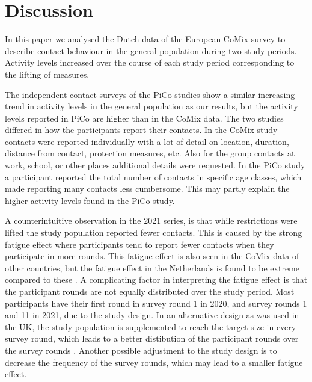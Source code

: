 \documentclass[fleqn,10pt]{wlscirep}
\begin{document}
\section*{Discussion}

In this paper we analysed the Dutch data of the European CoMix survey to describe contact behaviour in the general population during two study periods. Activity levels increased over the course of each study period corresponding to the lifting of measures. %

The independent contact surveys of the PiCo studies show a similar increasing trend in activity levels in the general population as our results, but the activity levels reported in PiCo are higher than in the CoMix data. The two studies differed in how the participants report their contacts. In the CoMix study contacts were reported individually with a lot of detail on location, duration, distance from contact, protection measures, etc. Also for the group contacts at work, school, or other places additional details were requested. In the PiCo study a participant reported the total number of contacts in specific age classes, which made reporting many contacts less cumbersome. This may partly explain the higher activity levels found in the PiCo study.

A counterintuitive observation in the 2021 series, is that while restrictions were lifted the study population reported fewer contacts. This is caused by the strong fatigue effect where participants tend to report fewer contacts when they participate in more rounds. This fatigue effect is also seen in the CoMix data of other countries, but the fatigue effect in the Netherlands is found to be extreme compared to these \cite{Wong_2022b}. A complicating factor in interpreting the fatigue effect is that the participant rounds are not equally distributed over the study period. Most participants have their first round in survey round 1 in 2020, and survey rounds 1 and 11 in 2021, due to the study design. In an alternative design as was used in the UK, the study population is supplemented to reach the target size in every survey round, which leads to a better distibution of the participant rounds over the survey rounds \cite{Gimma_2022}. Another possible adjustment to the study design is to decrease the frequency of the survey rounds, which may lead to a smaller fatigue effect.
\end{document}
